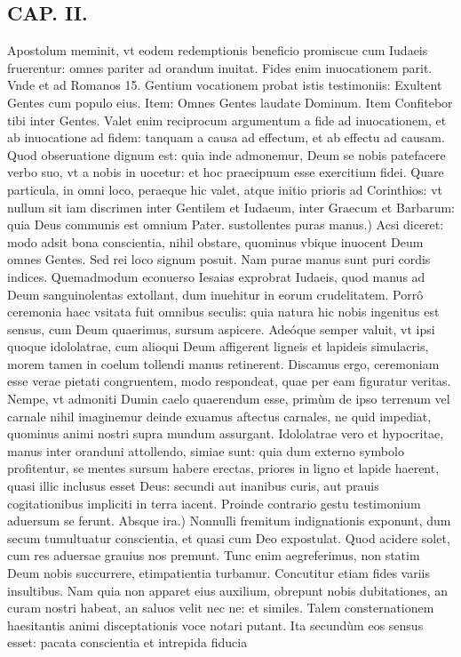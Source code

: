 \documentclass{article}
\begin{document}
\begin{pages}
\section*{CAP. II. }
\marginpar{[ p.25 ]}\pstart Apostolum meminit, vt eodem redemptionis beneficio promiscue cum Iudaeis fruerentur: omnes pariter ad orandum inuitat. Fides enim inuocationem parit. Vnde et ad Romanos 15. Gentium vocationem probat istis testimoniis: Exultent Gentes cum populo eius. Item: Omnes Gentes laudate Dominum. Item Confitebor tibi inter Gentes. Valet enim reciprocum argumentum a fide ad inuocationem, et ab inuocatione ad fidem: tanquam a causa ad effectum, et ab effectu ad causam. Quod obseruatione dignum est: quia inde admonemur, Deum se nobis patefacere verbo suo, vt a nobis in uocetur: et hoc praecipuum esse exercitium fidei. Quare particula, in omni loco, peraeque hic valet, atque initio prioris ad Corinthios: vt nullum sit iam discrimen inter Gentilem et Iudaeum, inter Graecum et Barbarum: quia Deus communis est omnium Pater.  \pend\pstart sustollentes puras manus.) Acsi diceret: modo adsit bona conscientia, nihil obstare, quominus vbique inuocent Deum omnes Gentes. Sed rei loco signum posuit. Nam purae manus sunt puri cordis indices. Quemadmodum econuerso Iesaias exprobrat Iudaeis, quod manus ad Deum sanguinolentas extollant, dum inuehitur in eorum crudelitatem. Porrô ceremonia haec vsitata fuit omnibus seculis: quia natura hic nobis ingenitus est sensus, cum Deum quaerimus, sursum aspicere. Adeóque semper valuit, vt ipsi quoque idololatrae, cum alioqui Deum affigerent ligneis et lapideis simulacris, morem tamen in coelum tollendi manus retinerent. Discamus ergo, ceremoniam esse verae pietati congruentem, modo respondeat, quae per eam figuratur veritas. Nempe, vt admoniti Dumin caelo quaerendum esse, primùm de ipso terrenum vel carnale nihil imaginemur deinde exuamus aftectus carnales, ne quid impediat, quominus animi nostri supra mundum assurgant. Idololatrae vero et hypocritae, manus inter oranduni attollendo, simiae sunt: quia dum externo symbolo profitentur, se mentes sursum habere erectas, priores in ligno et lapide haerent, quasi illic inclusus esset Deus: secundi aut inanibus curis, aut prauis cogitationibus impliciti in terra iacent. Proinde contrario gestu testimonium aduersum se ferunt.  \pend\pstart Absque ira.) Nonnulli fremitum indignationis exponunt, dum secum tumultuatur conscientia, et quasi cum Deo expostulat. Quod acidere solet, cum res aduersae grauius nos premunt. Tunc enim aegreferimus, non statim Deum nobis succurrere, etimpatientia turbamur. Concutitur etiam fides variis insultibus. Nam quia non apparet eius auxilium, obrepunt nobis dubitationes, an curam nostri habeat, an saluos velit nec ne: et similes. Talem consternationem haesitantis animi disceptationis voce notari putant. Ita secundùm eos sensus esset: pacata conscientia et intrepida fiducia  \pend

\end{pages}
\end{document}
